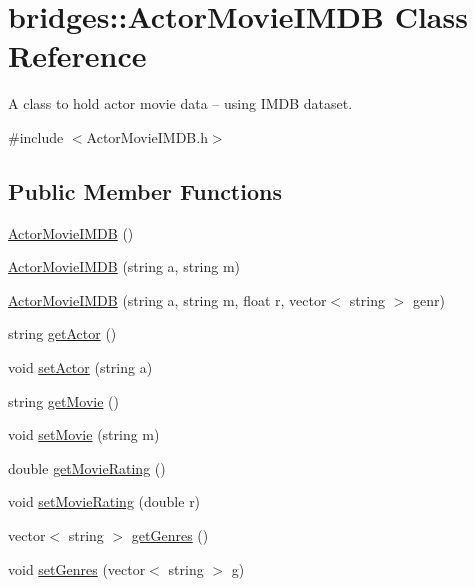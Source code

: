 \hypertarget{classbridges_1_1_actor_movie_i_m_d_b}{}\section{bridges\+:\+:Actor\+Movie\+I\+M\+D\+B Class Reference}
\label{classbridges_1_1_actor_movie_i_m_d_b}


A class to hold actor movie data -- using I\+M\+D\+B dataset.  




{\ttfamily \#include $<$Actor\+Movie\+I\+M\+D\+B.\+h$>$}

\subsection*{Public Member Functions}
\begin{DoxyCompactItemize}
\item 
\hyperlink{classbridges_1_1_actor_movie_i_m_d_b_acd1db3914821a79a7d8fb506151d36a4}{Actor\+Movie\+I\+M\+D\+B} ()
\item 
\hyperlink{classbridges_1_1_actor_movie_i_m_d_b_a4dff1ed0200a4c1013bd33d566e57640}{Actor\+Movie\+I\+M\+D\+B} (string a, string m)
\item 
\hyperlink{classbridges_1_1_actor_movie_i_m_d_b_a8d9cba2169fb26d97754a524c348cf86}{Actor\+Movie\+I\+M\+D\+B} (string a, string m, float r, vector$<$ string $>$ genr)
\item 
string \hyperlink{classbridges_1_1_actor_movie_i_m_d_b_a35e46f1c3cfb30f196710c5b9c437b86}{get\+Actor} ()
\item 
void \hyperlink{classbridges_1_1_actor_movie_i_m_d_b_a97447a734487e56ab9c785d056363e68}{set\+Actor} (string a)
\item 
string \hyperlink{classbridges_1_1_actor_movie_i_m_d_b_ae35c9a5c7ba79538f050e8009ddba786}{get\+Movie} ()
\item 
void \hyperlink{classbridges_1_1_actor_movie_i_m_d_b_a08b64b8728a59a08bb565c8556b01509}{set\+Movie} (string m)
\item 
double \hyperlink{classbridges_1_1_actor_movie_i_m_d_b_abf558f49397e41f2a5edf0e6011c97e4}{get\+Movie\+Rating} ()
\item 
void \hyperlink{classbridges_1_1_actor_movie_i_m_d_b_aea16db5315526ff31a1685c08390cdc7}{set\+Movie\+Rating} (double r)
\item 
vector$<$ string $>$ \hyperlink{classbridges_1_1_actor_movie_i_m_d_b_a5d768342eb18fbf65cd6c20b73b93b6c}{get\+Genres} ()
\item 
void \hyperlink{classbridges_1_1_actor_movie_i_m_d_b_a04858487370565e12e112a6355654ce5}{set\+Genres} (vector$<$ string $>$ g)
\end{DoxyCompactItemize}


